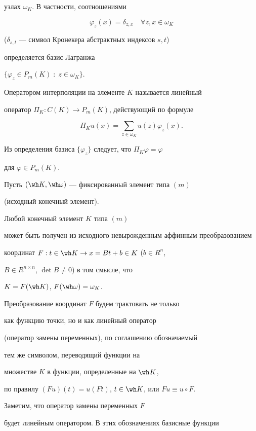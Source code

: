 узлах $\omega_K$. В частности, соотношениями 


$$


\varphi_z (x)=\delta_{z,x} \quad \forall z,x \in \omega_K 


$$


($\delta_{s,t}$ --- символ Кронекера абстрактных индексов $s,t$) 


определяется базис Лагранжа


$\{ \varphi_z \in P_m(K){\;:\;} z \in \omega_K \}$.


Оператором интерполяции на элементе $K$ называется линейный 


оператор $\Pi_K : C(K) \rightarrow P_m(K)$, действующий по формуле 


$$


\Pi_K u (x) = \sum _{z\in \omega_K} u(z)\varphi_z(x). 


$$


Из определения базиса $\{\varphi_z\}$ следует, что $\Pi_K \varphi=\varphi$ 


для $\varphi \in P_m(K)$. 





Пусть $(\wh K, \wh \omega)$ --- фиксированный элемент типа $(m)$ 


(исходный конечный элемент). 


Любой конечный элемент $K$ типа $(m)$ 


может быть получен из исходного невырожденным аффинным преобразованием 


координат $F : t \in \wh K \rightarrow x =B t +b \in K$ ($b \in R^n$, 


$B \in R^{n \times n}$,  $\det B \neq 0$) в том смысле, что 


$K=F(\wh K)$, $F(\wh \omega)=\omega_K$. 


Преобразование координат $F$ будем трактовать не только 


как функцию точки, но и как линейный оператор 


(оператор замены переменных), по соглашению обозначаемый 


тем же символом, переводящий функции на 


множестве $K$ в функции, определенные на $\wh K$, 


по правилу $(Fu)(t) =u(Ft)$, $t \in \wh K$, или $Fu \equiv u \circ F$. 


Заметим, что оператор замены переменных $F$ 


будет линейным оператором. В этих обозначениях базисные функции 


